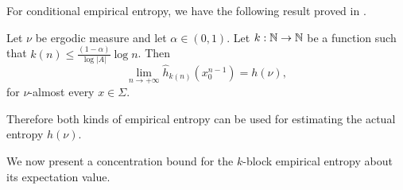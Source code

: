 For conditional empirical entropy, we have the following result proved in \cite[Theorem II.3.5]{shields:ergodic}.

\begin{theorem} \label{thm:entropy-estimation}
	 Let $\nu$ be ergodic measure and let $\alpha \in (0, 1)$. Let $k : \mathbb{N} \to \mathbb{N}$ be a function such that $k(n) \leq \frac{(1 - \alpha)}{\log{|A|}}\log{n}$. Then
	 \[
	 	\lim_{n \to +\infty}{\hat{h}_{k(n)}(x_0^{n - 1})} = h(\nu),
	 \]
	 for $\nu$-almost every $x \in \Sigma$.
\end{theorem}

Therefore both kinds of empirical entropy can be used for estimating the actual entropy $h(\nu)$.

We now present a concentration bound for the $k$-block empirical entropy about its expectation value.

